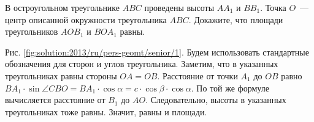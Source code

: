 \problem
В остроугольном треугольнике $ABC$ проведены высоты $A A_1$ и $B B_1$.
Точка $O$~--- центр описанной окружности треугольника $ABC$.
Докажите, что площади треугольников $A O B_1$ и $B O A_1$ равны.

%
\label{solution:2013/ru/pers-geomt/senior/1}
Рис. \ref{fig:solution:2013/ru/pers-geomt/senior/1}.
Будем использовать стандартные обозначения для сторон и углов треугольника.
Заметим, что в указанных треугольниках равны стороны $OA = OB$.
Расстояние от точки $A_1$ до $OB$ равно
\(
    B A_1 \cdot \sin \angle CBO
=
    B A_1 \cdot \cos \alpha
=
    c \cdot \cos \beta \cdot \cos \alpha
\).
По той же формуле вычисляется расстояние от $B_1$ до $AO$.
Следовательно, высоты в указанных треугольниках тоже равны.
Значит, равны и площади.
\endproblem
